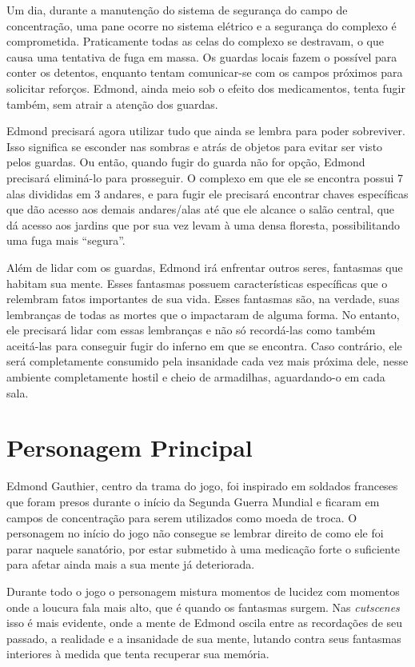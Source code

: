 \documentclass{article}
\begin{document}
    Um dia, durante a manutenção do sistema de segurança do campo de concentração, uma pane ocorre no sistema elétrico e a segurança do complexo é comprometida. Praticamente todas as celas do complexo se destravam, o que causa uma tentativa de fuga em massa. Os guardas locais fazem o possível para conter os detentos, enquanto tentam comunicar-se com os campos próximos para solicitar reforços. Edmond, ainda meio sob o efeito dos medicamentos, tenta fugir também, sem atrair a atenção dos guardas. 
    
    Edmond precisará agora utilizar tudo que ainda se lembra para poder sobreviver. Isso significa se esconder nas sombras e atrás de objetos para evitar ser visto pelos guardas. Ou então, quando fugir do guarda não for opção, Edmond precisará eliminá-lo para prosseguir. O complexo em que ele se encontra possui 7 alas divididas em 3 andares, e para fugir ele precisará encontrar chaves específicas que dão acesso aos demais andares/alas até que ele alcance o salão central, que dá acesso aos jardins que por sua vez levam à uma densa floresta, possibilitando uma fuga mais “segura”.
    
    Além de lidar com os guardas, Edmond irá enfrentar outros seres, fantasmas que habitam sua mente. Esses fantasmas possuem características específicas que o relembram fatos importantes de sua vida. Esses fantasmas são, na verdade, suas lembranças de todas as mortes que o impactaram de alguma forma. No entanto, ele precisará lidar com essas lembranças e não só recordá-las como também aceitá-las para conseguir fugir do inferno em que se encontra. Caso contrário, ele será completamente consumido pela insanidade cada vez mais próxima dele, nesse ambiente completamente hostil e cheio de armadilhas, aguardando-o em cada sala. 

\section{Personagem Principal}
Edmond Gauthier, centro da trama do jogo, foi inspirado em soldados franceses que foram presos durante o início da Segunda Guerra Mundial e ficaram em campos de concentração para serem utilizados como moeda de troca. O personagem no início do jogo não consegue se lembrar direito de como ele foi parar naquele sanatório, por estar submetido à uma medicação forte o suficiente para afetar ainda mais a sua mente já deteriorada.

Durante todo o jogo o personagem mistura momentos de lucidez com momentos onde a loucura fala mais alto, que é quando os fantasmas surgem. Nas \textit{cutscenes} isso é mais evidente, onde a mente de Edmond oscila entre as recordações de seu passado, a realidade e a insanidade de sua mente, lutando contra seus fantasmas interiores à medida que tenta recuperar sua memória.
\end{document}
